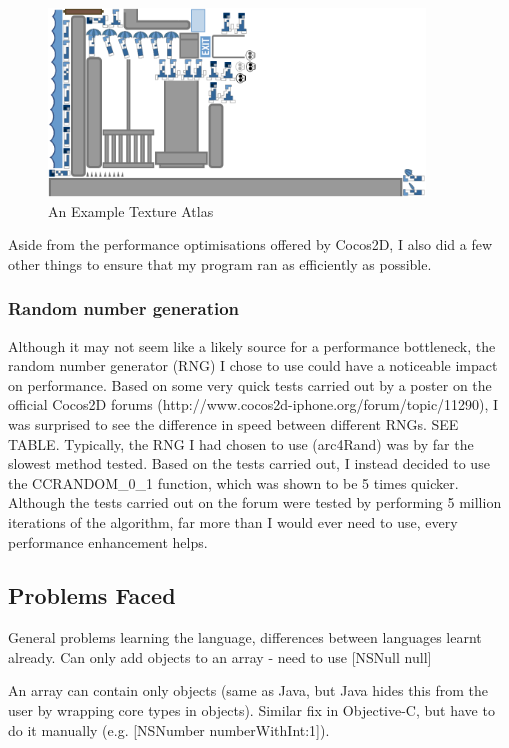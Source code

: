 \documentclass[a4paper,oneside]{report}
\begin{document}
\begin{figure}[h!]
  \centering
    \includegraphics[width=100mm]{sources/images/Texture_atlas}
    \caption{An Example Texture Atlas}
\end{figure}

Aside from the performance optimisations offered by Cocos2D, I also did a few other things to ensure that my program ran as efficiently as possible.

\subsubsection{Random number generation} 

Although it may not seem like a likely source for a performance bottleneck, the random number generator (RNG) I chose to use could have a noticeable impact on performance. Based on some very quick tests carried out by a poster on the official Cocos2D forums (http://www.cocos2d-iphone.org/forum/topic/11290), I was surprised to see the difference in speed between different RNGs. SEE TABLE. Typically, the RNG I had chosen to use (arc4Rand) was by far the slowest method tested. Based on the tests carried out, I instead decided to use the CCRANDOM\_0\_1 function, which was shown to be 5 times quicker. Although the tests carried out on the forum were tested by performing 5 million iterations of the algorithm, far more than I would ever need to use, every performance enhancement helps.
		
\subsection{Problems Faced} 

General problems learning the language, differences between languages learnt already. Can only add objects to an array - need to use [NSNull null]

An array can contain only objects (same as Java, but Java hides this from the user by wrapping core types in objects). Similar fix in Objective-C, but have to do it manually (e.g. [NSNumber numberWithInt:1]).
\end{document}
